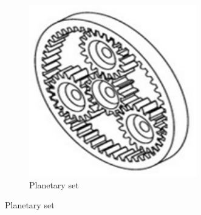 \begin{figure}[H]
\begin{subfigure}[b]{.32\linewidth}
		\includegraphics[width=0.8\textwidth]{imgs/gear_planetary.png}
		\caption{Planetary set}
	\end{subfigure}
	

\end{figure}
